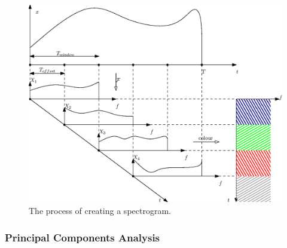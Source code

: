 \begin{figure}[h!]
	\centering
		\includegraphics{drawings/spec.eps}
	\caption{The process of creating a spectrogram.}
	\label{fig:spec}
\end{figure}

\subsubsection{Principal Components Analysis}
